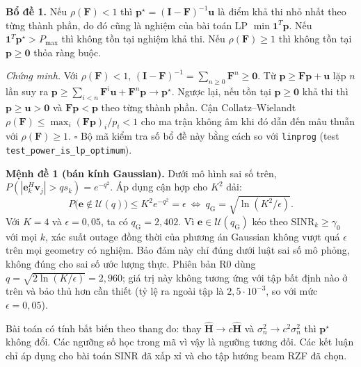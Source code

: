 \documentclass[11pt,onecolumn]{IEEEtran}
\begin{document}
\textbf{Bổ đề 1.} Nếu $\rho(\mathbf F)<1$ thì $\mathbf p^\star=(\mathbf I-\mathbf F)^{-1}\mathbf u$ là điểm khả thi nhỏ nhất theo từng thành phần, do đó cũng là nghiệm của bài toán LP $\min\mathbf 1^T\mathbf p$. Nếu $\mathbf 1^T\mathbf p^\star>P_{\max}$ thì không tồn tại nghiệm khả thi. Nếu $\rho(\mathbf F)\geq1$ thì không tồn tại $\mathbf p\geq\mathbf 0$ thỏa ràng buộc.

\textit{Chứng minh.} Với $\rho(\mathbf F)<1$, $(\mathbf I-\mathbf F)^{-1}=\sum_{n\geq0}\mathbf F^n\geq\mathbf 0$. Từ $\mathbf p\geq\mathbf F\mathbf p+\mathbf u$ lặp $n$ lần suy ra $\mathbf p\geq\sum_{i<n}\mathbf F^i\mathbf u+\mathbf F^n\mathbf p\to\mathbf p^\star$. Ngược lại, nếu tồn tại $\mathbf p\geq\mathbf 0$ khả thi thì $\mathbf p\geq\mathbf u>\mathbf 0$ và $\mathbf F\mathbf p<\mathbf p$ theo từng thành phần. Cận Collatz--Wielandt $\rho(\mathbf F)\leq\max_i(\mathbf F\mathbf p)_i/p_i<1$ cho ma trận không âm khi đó dẫn đến mâu thuẫn với $\rho(\mathbf F)\geq1$. $\square$ Bộ mã kiểm tra số bổ đề này bằng cách so với \texttt{linprog} (test \texttt{test\_power\_is\_lp\_optimum}).

\textbf{Mệnh đề 1 (bán kính Gaussian).} Dưới mô hình sai số trên, $P(|\mathbf e_k^H\mathbf v_j|>q s_k)=e^{-q^2}$. Áp dụng cận hợp cho $K^2$ dải:
\begin{equation}
P\big(\mathbf e\notin\mathcal U(q)\big)\leq K^2e^{-q^2}=\epsilon\ \Longleftrightarrow\ q_{\mathrm G}=\sqrt{\ln(K^2/\epsilon)} .
\end{equation}
Với $K=4$ và $\epsilon=0{,}05$, ta có $q_{\mathrm G}=2{,}402$. Vì $\mathbf e\in\mathcal U(q_{\mathrm G})$ kéo theo $\mathrm{SINR}_k\geq\gamma_0$ với mọi $k$, xác suất outage đồng thời của phương án Gaussian không vượt quá $\epsilon$ trên mọi geometry có nghiệm. Bảo đảm này chỉ đúng dưới luật sai số mô phỏng, không đúng cho sai số ước lượng thực. Phiên bản R0 dùng $q=\sqrt{2\ln(K/\epsilon)}=2{,}960$; giá trị này không tương ứng với tập bất định nào ở trên và bảo thủ hơn cần thiết (tỷ lệ ra ngoài tập là $2{,}5\cdot10^{-3}$, so với mức $\epsilon=0{,}05$).

Bài toán có tính bất biến theo thang đo: thay $\widehat{\mathbf H}\to c\widehat{\mathbf H}$ và $\sigma_n^2\to c^2\sigma_n^2$ thì $\mathbf p^\star$ không đổi. Các ngưỡng số học trong mã vì vậy là ngưỡng tương đối. Các kết luận chỉ áp dụng cho bài toán SINR đã xấp xỉ và cho tập hướng beam RZF đã chọn.
\end{document}
